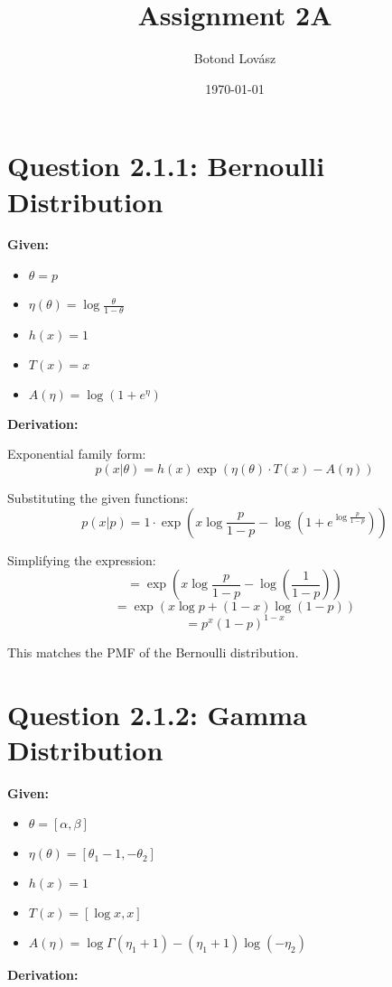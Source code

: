 \documentclass{article}
\title{Assignment 2A}
\author{Botond Lovász}
\date{\today}
\begin{document}
\maketitle

\section*{Question 2.1.1: Bernoulli Distribution}

\textbf{Given:}
\begin{itemize}
    \item \( \theta = p \)
    \item \( \eta(\theta) = \log \frac{\theta}{1-\theta} \)
    \item \( h(x) = 1 \)
    \item \( T(x) = x \)
    \item \( A(\eta) = \log(1 + e^\eta) \)
\end{itemize}

\textbf{Derivation:}

Exponential family form:
\[
p(x|\theta) = h(x) \exp(\eta(\theta) \cdot T(x) - A(\eta))
\]

Substituting the given functions:
\[
p(x|p) = 1 \cdot \exp\left(x \log \frac{p}{1-p} - \log(1 + e^{\log \frac{p}{1-p}})\right)
\]

Simplifying the expression:
\[
= \exp\left(x \log \frac{p}{1-p} - \log\left(\frac{1}{1-p}\right)\right)
\]
\[
= \exp\left(x \log p + (1-x) \log(1-p)\right)
\]
\[
= p^x (1-p)^{1-x}
\]

This matches the PMF of the Bernoulli distribution.

\section*{Question 2.1.2: Gamma Distribution}

\textbf{Given:}
\begin{itemize}
    \item \( \theta = [\alpha, \beta] \)
    \item \( \eta(\theta) = [\theta_1 - 1, -\theta_2] \)
    \item \( h(x) = 1 \)
    \item \( T(x) = [\log x, x] \)
    \item \( A(\eta) = \log \Gamma(\eta_1 + 1) - (\eta_1 + 1) \log(-\eta_2) \)
\end{itemize}

\textbf{Derivation:}
\end{document}

